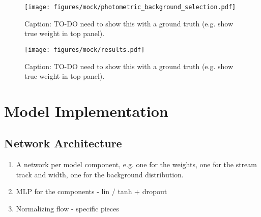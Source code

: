 \documentclass[twocolumn]{aastex631}
\newcommand{\mbf}[1]{\mathbf{#1}}
\newcommand{\pdf}{P}
\begin{document}



        




        \begin{figure}
            \centering
            \texttt{[image: figures/mock/photometric\_background\_selection.pdf]}
            \caption{Caption: TO-DO need to show this with a ground truth (e.g. show true weight in top panel).}
            \label{fig:mock_data_photometric_background_selection}
        \end{figure}

        \begin{figure*}
            \centering
            \texttt{[image: figures/mock/results.pdf]}
            \caption{Caption: TO-DO need to show this with a ground truth (e.g. show true weight in top panel).}
            \label{fig:mock_data_result}
        \end{figure*}


\section{Model Implementation}

    \subsection{Network Architecture}

        \begin{enumerate}
            \item A network per model component, e.g. one for the weights, one for the stream track and width, one for the background distribution.
            \item MLP for the components - lin / tanh + dropout
            \item Normalizing flow - specific pieces
        \end{enumerate}
\end{document}
